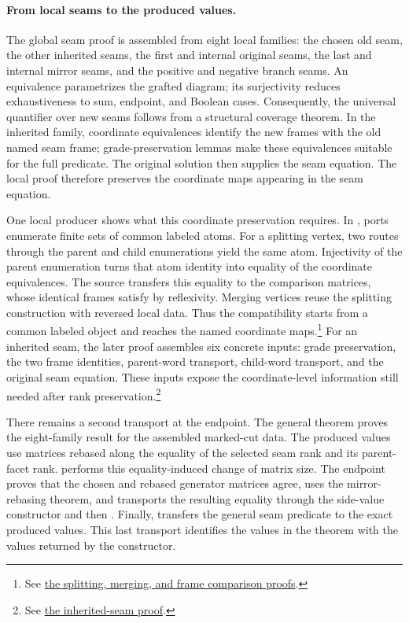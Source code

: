 \paragraph{From local seams to the produced values.}
The global seam proof is assembled from eight local families: the chosen
old seam, the other inherited seams, the first and internal original
seams, the last and internal mirror seams, and the positive and negative
branch seams. An equivalence parametrizes the grafted diagram; its surjectivity reduces exhaustiveness to sum, endpoint, and Boolean cases. Consequently, the universal quantifier over new seams follows
from a structural coverage theorem. In the inherited family, coordinate
equivalences identify the new frames with the old named seam frame;
grade-preservation lemmas make these equivalences suitable for the full
predicate. The original solution then supplies the seam equation. The local proof therefore preserves the coordinate maps appearing in the seam equation.

One local producer shows what this coordinate preservation requires.
In , ports enumerate finite sets of common labeled
atoms. For a splitting vertex, two routes through the parent and child
enumerations yield the same atom. Injectivity of the parent enumeration
turns that atom identity into equality of the coordinate equivalences.
The source transfers this equality to the comparison matrices, whose
identical frames satisfy  by reflexivity.
Merging vertices reuse the splitting construction with reversed local
data. Thus the compatibility starts from a common labeled object and
reaches the named coordinate maps.\footnote{See
\href{https://github.com/openai/math/blob/fd4aeeb2ee4fc729c18d98444fed42fd0529eeeb/lean/OAI/AlgebraicGeometry/CharacterVarieties/Cutting/AtomicFrames.lean\#L179-L227}{the splitting, merging, and frame comparison proofs}.}
For an inherited seam, the later proof assembles six concrete inputs:
grade preservation, the two frame identities, parent-word transport,
child-word transport, and the original seam equation. These inputs expose the coordinate-level information still needed after rank preservation.\footnote{See
\href{https://github.com/openai/math/blob/fd4aeeb2ee4fc729c18d98444fed42fd0529eeeb/lean/OAI/AlgebraicGeometry/CharacterVarieties/Frames/InheritedSeams.lean\#L117-L155}{the inherited-seam proof}.}

There remains a second transport at the endpoint. The general
 theorem proves the eight-family result for the
assembled marked-cut data. The produced values use matrices rebased along
the equality of the selected seam rank and its parent-facet rank.
 performs this equality-induced change of matrix size.
The endpoint proves that the chosen and rebased generator matrices agree,
uses the mirror-rebasing theorem, and transports the resulting equality
through the side-value constructor and then .
Finally,  transfers the general
seam predicate to the exact produced values. This last transport identifies the values in the theorem with the values returned by the constructor.

